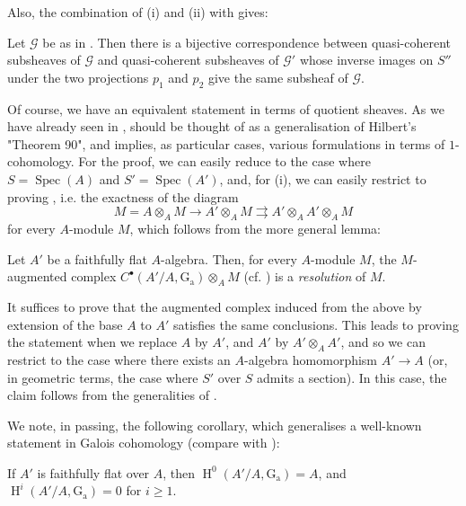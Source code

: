 Also, the combination of (i) and (ii) with  gives:


\begin{corollary}\label{fga3.i-b.1-corollary-2}
    Let $\mathcal{G}$ be as in .
    Then there is a bijective correspondence between quasi-coherent subsheaves of $\mathcal{G}$ and quasi-coherent subsheaves of $\mathcal{G}'$ whose inverse images on $S''$ under the two projections $p_1$ and $p_2$ give the same subsheaf of $\mathcal{G}$.
\end{corollary}

Of course, we have an equivalent statement in terms of quotient sheaves.
As we have already seen in ,  should be thought of as a generalisation of Hilbert's "Theorem 90", and implies, as particular cases, various formulations in terms of $1$-cohomology.
For the proof, we can easily reduce to the case where $S=\operatorname{Spec}(A)$ and $S'=\operatorname{Spec}(A')$, and, for (i), we can easily restrict to proving , i.e. the exactness of the diagram
\[
    M = A\otimes_A M \to
    A'\otimes_A M \rightrightarrows
    A'\otimes_A A'\otimes_A M
\]
for every $A$-module $M$, which follows from the more general lemma:

\begin{lemma}\label{fga3.i-b.1-lemma-1.1}
    Let $A'$ be a faithfully flat $A$-algebra.
    Then, for every $A$-module $M$, the $M$-augmented complex $C^\bullet(A'/A,\operatorname{G_a})\otimes_A M$ (cf. ) is a \emph{resolution} of $M$.
\end{lemma}

\begin{cproof}
    It suffices to prove that the augmented complex induced from the above by extension of the base $A$ to $A'$ satisfies the same conclusions.
    This leads to proving the statement when we replace $A$ by $A'$, and $A'$ by $A'\otimes_A A'$, and so we can restrict to the case where there exists an $A$-algebra homomorphism $A'\to A$ (or, in geometric terms, the case where $S'$ over $S$ admits a section).
    In this case, the claim follows from the generalities of .
\end{cproof}


We note, in passing, the following corollary, which generalises a well-known statement in Galois cohomology (compare with ):


\begin{corollary}\label{fga3.i-b.1-lemma-1.1-corollary}
    If $A'$ is faithfully flat over $A$, then $\operatorname{H}^0(A'/A,\operatorname{G_a})=A$, and $\operatorname{H}^i(A'/A,\operatorname{G_a})=0$ for $i\geqslant1$.
\end{corollary}


